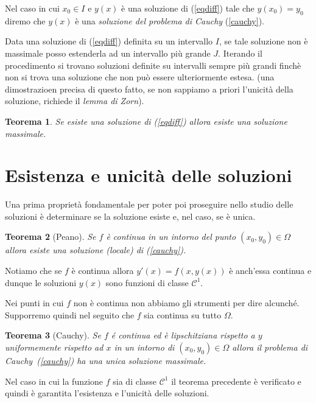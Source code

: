 \documentclass[italian,a4paper]{article}
\newcommand{\CC}{\mathcal{C}}
\newtheorem{theorem}{Teorema}[section]
\begin{document}
Nel caso in cui $x_0\in I$ e $y(x)$ \`e una soluzione di
(\ref{eqdiff}) tale che $y(x_0)=y_0$ diremo che $y(x)$ \`e una
\emph{soluzione del problema di Cauchy} (\ref{cauchy}).

Data una soluzione di (\ref{eqdiff}) definita su un intervallo $I$, se
tale soluzione non \`e
massimale posso estenderla ad un intervallo pi\`u grande
$J$. Iterando il procedimento si trovano soluzioni definite su
intervalli sempre pi\`u grandi finch\`e non si trova
una soluzione che non pu\`o essere ulteriormente estesa. (una
dimostrazioen precisa di questo fatto, se non sappiamo a priori l'unicit\`a della soluzione, richiede il \emph{lemma di Zorn}).

\begin{theorem}
Se esiste una soluzione di (\ref{eqdiff}) allora esiste una soluzione
massimale.
\end{theorem}



\section{Esistenza e unicit\`a delle soluzioni}

Una prima propriet\`a fondamentale per poter poi proseguire nello
studio delle soluzioni \`e determinare se la soluzione esiste e, nel
caso, se \`e unica.

\begin{theorem}[Peano]
Se $f$ \`e continua in un intorno del punto $(x_0,y_0)\in\Omega$
allora esiste una soluzione (locale) di (\ref{cauchy}).
\end{theorem}

Notiamo che se
$f$ \`e continua allora $y'(x)=f(x,y(x))$ \`e anch'essa continua e
dunque le soluzioni $y(x)$ sono funzioni di classe $\CC^1$.

Nei punti in cui $f$ non \`e continua non abbiamo gli strumenti per
dire alcunch\'e. Supporremo quindi nel seguito che $f$ sia continua su
tutto $\Omega$.

\begin{theorem}[Cauchy]\label{unicita}
Se $f$ \'e continua ed \`e lipschitziana rispetto
a $y$ uniformemente rispetto ad $x$ 
in un intorno di $(x_0,y_0)\in\Omega$ allora il problema di
Cauchy~(\ref{cauchy}) ha una unica soluzione massimale.
\end{theorem}

Nel caso in cui la funzione $f$ sia di classe $\CC^1$ il teorema
precedente \`e verificato e quindi \`e garantita l'esistenza e
l'unicit\`a delle soluzioni. 
\end{document}

